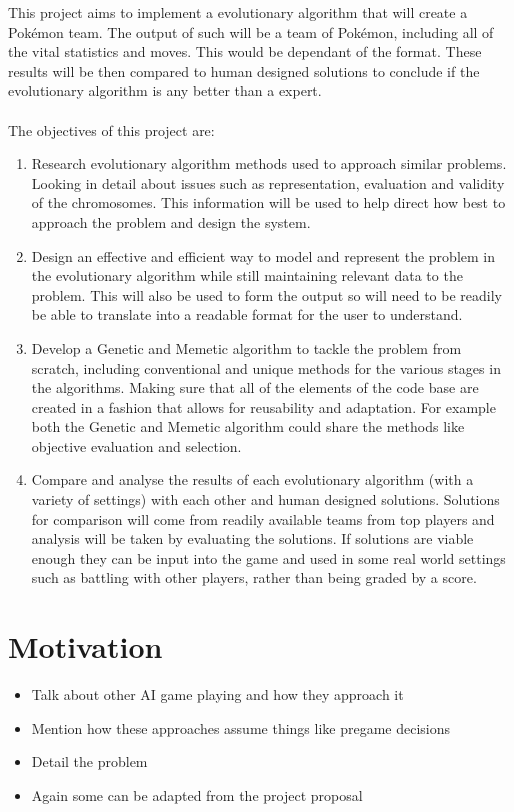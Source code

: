 \documentclass[a4paper]{article}
\newcommand{\Pokemon}{Pok\'{e}mon}
\begin{document}
This project aims to implement a evolutionary algorithm that will create a \Pokemon{} team.
The output of such will be a team of \Pokemon{}, including all of the vital statistics and moves.
This would be dependant of the format. These results will be then compared to human designed solutions to conclude if the evolutionary algorithm is any better than a expert.\\
\\The objectives of this project are:
\begin{enumerate}
    \item Research evolutionary algorithm methods used to approach similar problems.
    Looking in detail about issues such as representation, evaluation and validity of the chromosomes.
    This information will be used to help direct how best to approach the problem and design the system.
    \item Design an effective and efficient way to model and represent the problem in the evolutionary algorithm while still maintaining relevant data to the problem.
    This will also be used to form the output so will need to be readily be able to translate into a readable format for the user to understand.
    \item Develop a Genetic and Memetic algorithm to tackle the problem from scratch, including conventional and unique methods for the various stages in the algorithms.
    Making sure that all of the elements of the code base are created in a fashion that allows for reusability and adaptation.
    For example both the Genetic and Memetic algorithm could share the methods like objective evaluation and selection.
    \item Compare and analyse the results of each evolutionary algorithm (with a variety of settings) with each other and human designed solutions.
    Solutions for comparison will come from readily available teams from top players and analysis will be taken by evaluating the solutions.
    If solutions are viable enough they can be input into the game and used in some real world settings such as battling with other players, rather than being graded by a score.
\end{enumerate}

\section{Motivation}
\begin{itemize}
    \item Talk about other AI game playing and how they approach it
    \item Mention how these approaches assume things like pregame decisions
    \item Detail the problem
    \item Again some can be adapted from the project proposal
\end{itemize}
\end{document}
